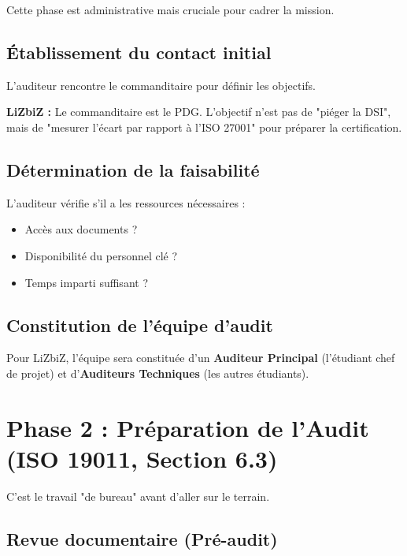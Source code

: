 Cette phase est administrative mais cruciale pour cadrer la mission.

\subsection{Établissement du contact initial}

L'auditeur rencontre le commanditaire pour définir les objectifs.

\begin{boxlizbiz}
\textbf{LiZbiZ :} Le commanditaire est le PDG. L'objectif n'est pas de "piéger la DSI", mais de "mesurer l'écart par rapport à l'ISO 27001" pour préparer la certification.
\end{boxlizbiz}

\subsection{Détermination de la faisabilité}

L'auditeur vérifie s'il a les ressources nécessaires :
\begin{itemize}
    \item Accès aux documents ?
    \item Disponibilité du personnel clé ?
    \item Temps imparti suffisant ?
\end{itemize}

\subsection{Constitution de l'équipe d'audit}

Pour LiZbiZ, l'équipe sera constituée d'un \textbf{Auditeur Principal} (l'étudiant chef de projet) et d'\textbf{Auditeurs Techniques} (les autres étudiants).

\section{Phase 2 : Préparation de l'Audit (ISO 19011, Section 6.3)}

C'est le travail "de bureau" avant d'aller sur le terrain.

\subsection{Revue documentaire (Pré-audit)}

